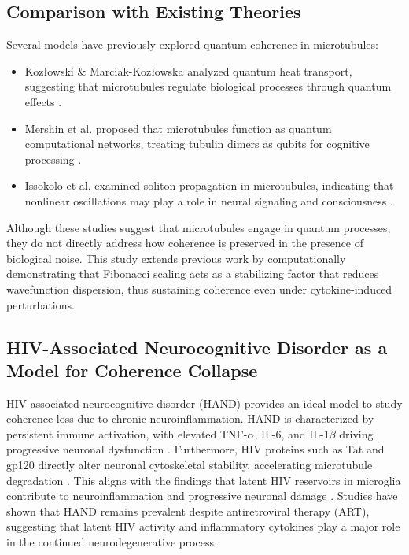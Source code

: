 \subsection{Comparison with Existing Theories}
Several models have previously explored quantum coherence in microtubules:
\begin{itemize}
\item Kozłowski \& Marciak-Kozłowska analyzed quantum heat transport, suggesting that microtubules regulate biological processes through quantum effects \cite{kozlowski_wave-gtdiffusion_2005}.
\item Mershin et al. proposed that microtubules function as quantum computational networks, treating tubulin dimers as qubits for cognitive processing \cite{mershin_quantum_2000}.
\item Issokolo et al. examined soliton propagation in microtubules, indicating that nonlinear oscillations may play a role in neural signaling and consciousness \cite{issokolo_localized_2024}.
\end{itemize}

Although these studies suggest that microtubules engage in quantum processes, they do not directly address how coherence is preserved in the presence of biological noise. This study extends previous work by computationally demonstrating that Fibonacci scaling acts as a stabilizing factor that reduces wavefunction dispersion, thus sustaining coherence even under cytokine-induced perturbations.

\subsection{HIV-Associated Neurocognitive Disorder as a Model for Coherence Collapse}
HIV-associated neurocognitive disorder (HAND) provides an ideal model to study coherence loss due to chronic neuroinflammation. HAND is characterized by persistent immune activation, with elevated TNF-$\alpha$, IL-6, and IL-1$\beta$ driving progressive neuronal dysfunction \cite{zhou_development_2025}. Furthermore, HIV proteins such as Tat and gp120 directly alter neuronal cytoskeletal stability, accelerating microtubule degradation \cite{thompson_hiv-associated_2024}. This aligns with the findings that latent HIV reservoirs in microglia contribute to neuroinflammation and progressive neuronal damage \cite{sreeram_potential_2022}. Studies have shown that HAND remains prevalent despite antiretroviral therapy (ART), suggesting that latent HIV activity and inflammatory cytokines play a major role in the continued neurodegenerative process \cite{thompson_hiv-associated_2024}.

